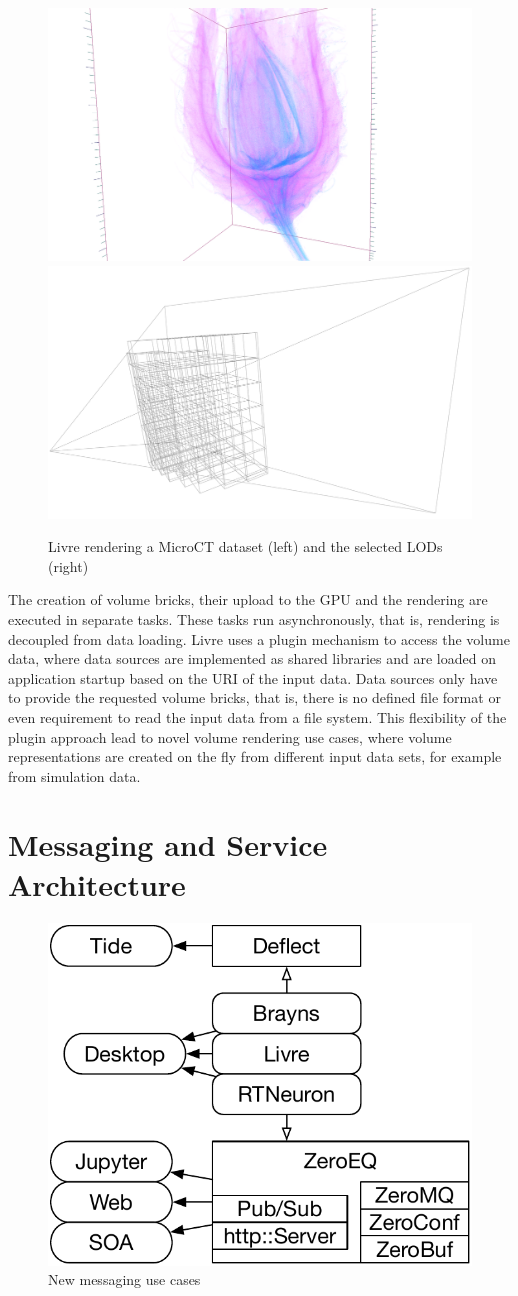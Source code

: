 \documentclass[10pt]{llncs}
\begin{document}
\begin{figure}[h!t]
    \includegraphics[width=.45\columnwidth]{images/livre}\hfill
    \includegraphics[width=.45\columnwidth]{images/livreLOD}
  \caption{\label{fLivre}Livre rendering a MicroCT dataset (left) and
    the selected LODs (right)}
\end{figure}

The creation of volume bricks, their upload to the GPU and the rendering are
executed in separate tasks. These tasks run asynchronously, that is, rendering
is decoupled from data loading. Livre uses a plugin mechanism to access the
volume data, where data sources are implemented as shared libraries and are
loaded on application startup based on the URI of the input data. Data sources
only have to provide the requested volume bricks, that is, there is no defined
file format or even requirement to read the input data from a file system. This
flexibility of the plugin approach lead to novel volume rendering use cases,
where volume representations are created on the fly from different input data
sets, for example from simulation data.


\section{Messaging and Service Architecture}

\begin{figure}\center\vspace{-6ex}
  \includegraphics[width=.382\textwidth]{images/ZeroMS}
  {\caption{\label{fZero}New messaging use cases}}\vspace{-2ex}
\end{figure}
\end{document}
